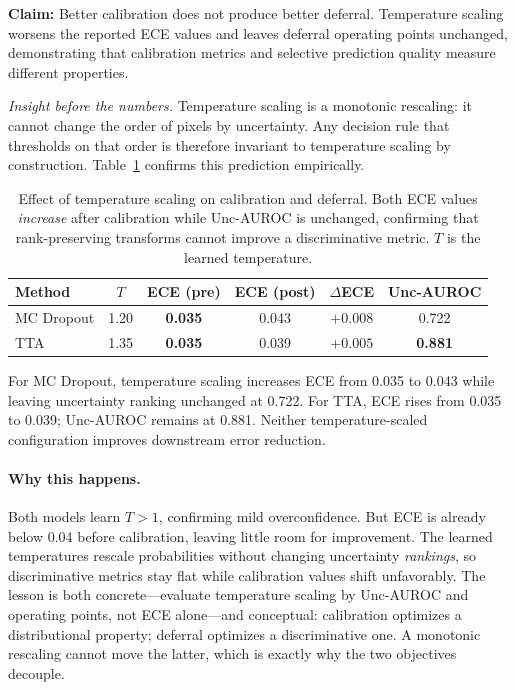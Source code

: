 \textbf{Claim:} Better calibration does not produce better deferral.
Temperature scaling worsens the reported ECE values and leaves deferral
operating points unchanged, demonstrating that calibration metrics and
selective prediction quality measure different properties.

\emph{Insight before the numbers.} Temperature scaling is a monotonic
rescaling: it cannot change the order of pixels by uncertainty. Any
decision rule that thresholds on that order is therefore invariant to
temperature scaling by construction. Table~\ref{tab:calibration} confirms
this prediction empirically.

\begin{table}[H]
\centering
\caption{Effect of temperature scaling on calibration and deferral. Both ECE
values \emph{increase} after calibration while Unc-AUROC is unchanged,
confirming that rank-preserving transforms cannot improve a discriminative
metric. $T$ is the learned temperature.}
\label{tab:calibration}
\scriptsize
\setlength{\tabcolsep}{4pt}
\renewcommand{\arraystretch}{1.05}
\begin{center}
\begin{tabular}{l c c c c c}
\toprule
\textbf{Method} & $T$ & \textbf{ECE (pre)} & \textbf{ECE (post)} &
$\Delta$\textbf{ECE} & \textbf{Unc-AUROC} \\
\midrule
MC Dropout & 1.20 & \textbf{0.035} & 0.043 & $+0.008$ & 0.722 \\
TTA        & 1.35 & \textbf{0.035} & 0.039 & $+0.005$ & \textbf{0.881} \\
\bottomrule
\end{tabular}
\end{center}
\end{table}

For MC Dropout, temperature scaling increases ECE from 0.035 to 0.043
while leaving uncertainty ranking unchanged at 0.722. For TTA, ECE rises
from 0.035 to 0.039; Unc-AUROC remains at 0.881. Neither temperature-scaled
configuration improves downstream error reduction.

\paragraph{Why this happens.} Both models learn $T > 1$, confirming mild
overconfidence. But ECE is already below 0.04 before calibration, leaving
little room for improvement. The learned temperatures rescale probabilities
without changing uncertainty \emph{rankings}, so discriminative metrics
stay flat while calibration values shift unfavorably. The lesson is both
concrete---evaluate temperature scaling by Unc-AUROC and operating points,
not ECE alone---and conceptual: calibration optimizes a distributional
property; deferral optimizes a discriminative one. A monotonic rescaling
cannot move the latter, which is exactly why the two objectives decouple.

